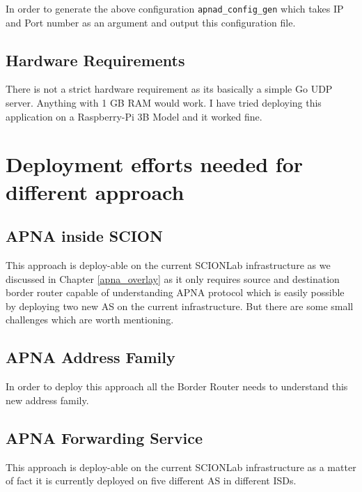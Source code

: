 In order to generate the above configuration \texttt{apnad\_config\_gen} which takes IP and Port number as an argument and output this configuration file.

\subsection{Hardware Requirements}
There is not a strict hardware requirement as its basically a simple Go UDP server. Anything with 1 GB RAM would work. I have tried deploying this application on a Raspberry-Pi 3B Model and it worked fine.

\section{Deployment efforts needed for different approach}

\subsection{APNA inside SCION}
This approach is deploy-able on the current SCIONLab infrastructure as we discussed in Chapter \ref{apna_overlay} as it only requires source and destination border router capable of understanding APNA protocol which is easily possible by deploying two new AS on the current infrastructure. But there are some small challenges which are worth mentioning.

\subsection{APNA Address Family}
In order to deploy this approach all the Border Router needs to understand this new address family.

\subsection{APNA Forwarding Service}
This approach is deploy-able on the current SCIONLab infrastructure as a matter of fact it is currently deployed on five different AS in different ISDs.